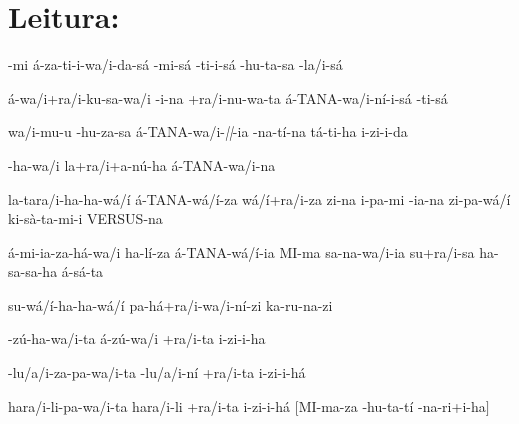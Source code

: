 
\chapter{Leitura: }

\clearpage

\begin{parnumbersr}

	\raggedright%
	\itshape%

	\lmasc{}-mi
	\spac{}á-za-ti-i-wa/i-da-sá
	-mi-sá
	-ti-i-sá
	-hu-ta-sa
	-la/i-sá

	á-wa/i+ra/i-ku-sa-wa/i
	\lbreak{}
	-i-na
	+ra/i-nu-wa-ta
	á-TANA-wa/i-ní-i-sá
	-ti-sá

	wa/i-mu-u
	-hu-za-sa á-TANA-wa/i-\emph{||}-ia
	-na-tí-na tá-ti-ha i-zi-i-da

	\lmasc{}-ha-wa/i
	\lmasc{}la+ra/i+a-nú-ha
	\lmasc{}á-TANA-wa/i-na

	\lmasc{}la-tara/i-ha-ha-wá/í
	\lmasc{}á-TANA-wá/í-za \lmasc{}wá/í+ra/i-za
	\lmasc{}zi-na \lmasc{}i-pa-mi \lmasc{}-ia-na
	\lmasc{}zi-pa-wá/í ki-sà-ta-mi-i \lmasc{}VERSUS-na

	\lmasc{}á-mi-ia-za-há-wa/i ha-lí-za
	\lmasc{}á-TANA-wá/í-ia \lmasc{}MI-ma
	sa-na-wa/i-ia \lmasc{}su+ra/i-sa
	\lmasc{}ha-sa-sa-ha á-sá-ta


	\lmasc{}su-wá/í-ha-ha-wá/í
	\lmasc{}pa-há+ra/i-wa/i-ní-zi
	\lmasc{}ka-ru-na-zi

	\lmasc{}-zú-ha-wa/i-ta á-zú-wa/i
	\lmasc{}+ra/i-ta \lmasc{}i-zi-i-ha

	-lu/a/i-za-pa-wa/i-ta \lmasc{}-lu/a/i-ní
	\lmasc{}+ra/i-ta \lmasc{}i-zi-i-há

	\lmasc{}hara/i-li-pa-wa/i-ta
	\lmasc{}hara/i-li \lmasc{}+ra/i-ta
	\lmasc{}i-zi-i-há $[$MI-ma-za
					\lmasc{}-hu-ta-tí -na-ri+i-ha$]$


\end{parnumbersr}


